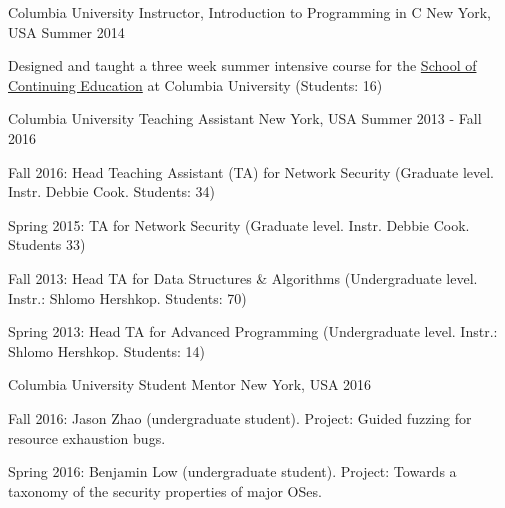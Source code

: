 

\begin{cventries}

  \cventry
    {Columbia University}
    {Instructor, Introduction to Programming in C}
    {New York, USA}
    {Summer 2014}
    {
    \begin{cvitems}
    \item Designed and taught a three week summer intensive course for the
        \href{http://sps.columbia.edu/high-school/nyc/junior-senior-courses/introduction-programming-in-c}{School of Continuing Education} at Columbia University (Students: 16)
    \end{cvitems}
    }
  \cventry
    {Columbia University}
    {Teaching Assistant}
    {New York, USA}
    {Summer 2013 - Fall 2016}
    {
      \begin{cvitems} %
      \item {Fall 2016: Head Teaching Assistant (TA) for Network Security (Graduate level. Instr. Debbie Cook. Students: 34)}
      \item {Spring 2015: TA for Network Security (Graduate level. Instr. Debbie Cook. Students 33)}
        \item {Fall 2013: Head TA for Data Structures \& Algorithms (Undergraduate level. Instr.: Shlomo Hershkop. Students: 70)}
        \item {Spring 2013: Head TA for Advanced Programming (Undergraduate level. Instr.: Shlomo Hershkop. Students: 14)}\\
      \end{cvitems}
    }


\cventry
    {Columbia University}
    {Student Mentor}
    {New York, USA}
    {2016}
    {
      \begin{cvitems}
      \item {Fall 2016: Jason Zhao (undergraduate student). Project: Guided fuzzing for resource exhaustion bugs.}
      \item {Spring 2016: Benjamin Low (undergraduate student). Project: Towards a taxonomy of the security properties of major OSes.}
      \end{cvitems}
    }
\end{cventries}
